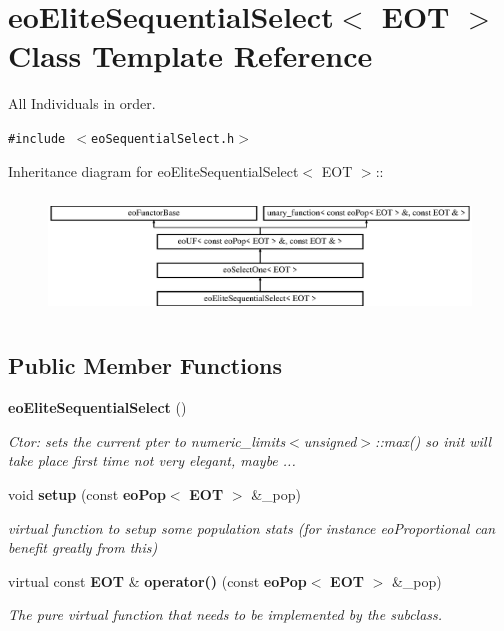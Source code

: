 \section{eo\-Elite\-Sequential\-Select$<$ EOT $>$ Class Template Reference}
\label{classeo_elite_sequential_select}
All Individuals in order.  


{\tt \#include $<$eo\-Sequential\-Select.h$>$}

Inheritance diagram for eo\-Elite\-Sequential\-Select$<$ EOT $>$::\begin{figure}[H]
\begin{center}
\leavevmode
\includegraphics[height=3.23699cm]{classeo_elite_sequential_select}
\end{center}
\end{figure}
\subsection*{Public Member Functions}
\begin{CompactItemize}
\item 
{\bf eo\-Elite\-Sequential\-Select} ()\label{classeo_elite_sequential_select_a0}

\begin{CompactList}\small\item\em Ctor: sets the current pter to numeric\_\-limits$<$unsigned$>$::max() so init will take place first time not very elegant, maybe ... \item\end{CompactList}\item 
void {\bf setup} (const {\bf eo\-Pop}$<$ {\bf EOT} $>$ \&\_\-pop)\label{classeo_elite_sequential_select_a1}

\begin{CompactList}\small\item\em virtual function to setup some population stats (for instance eo\-Proportional can benefit greatly from this) \item\end{CompactList}\item 
virtual const {\bf EOT} \& {\bf operator()} (const {\bf eo\-Pop}$<$ {\bf EOT} $>$ \&\_\-pop)\label{classeo_elite_sequential_select_a2}

\begin{CompactList}\small\item\em The pure virtual function that needs to be implemented by the subclass. \item\end{CompactList}\end{CompactItemize}
